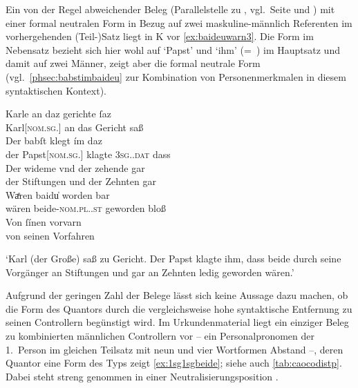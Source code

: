 \label{phsec:baideuwarn3}
Ein von der Regel abweichender Beleg (Parallelstelle zu \cite[\pno~75rb,3--4]{kc:C1}, vgl.~Seite \pageref{phsec:babstimbaideu} und
\pageref{phsec:baideuwarn}) mit einer formal neutralen Form in Bezug auf zwei
maskuline-männlich Referenten im vorhergehenden (Teil-)Satz liegt in
K vor \cref{ex:baideuwarn3}. Die Form  im Nebensatz
bezieht sich hier wohl auf
 `Papst' und  `ihm' (=~) im
Hauptsatz und damit auf zwei Männer, zeigt aber die formal neutrale Form
(vgl.~\cref{phsec:babstimbaideu} zur Kombination von Personenmerkmalen in
diesem syntaktischen Kontext).

\begin{exe}
\ex \label{ex:baideuwarn3}
	\gll Karle an daz gerichte ſaz \\
	    Karl[\textsc{nom.sg.\MascM}] an das Gericht saß \\
\sn \gll Der babſt klegt ím daz \\
		der Papst[\textsc{nom.sg.\MascM}] klagte \textsc{3sg.\MascM.dat} dass \\
\sn \gll Der wideme vnd der zehende gar \\
		der Stiftungen und der Zehnten gar \\
\sn \gll Waͤren baidu̍ worden bar \\
		wären beide-\textsc{nom.pl.\NeutM.st} geworden bloß \\
\sn \gll Von ſínen vorvarn \\
		von seinen Vorfahren \\
	\begin{taggedline}{\parencites[\pno~85vb,21--25]{kc:K}[vgl. abweichend][14382--14386]{schroeder1895}}
	\trans `Karl (der Große) saß zu Gericht. Der Papst klagte ihm, dass
		beide durch seine Vorgänger an Stiftungen und gar an Zehnten ledig
		geworden wären.'
	\end{taggedline}
\end{exe}

Aufgrund der geringen Zahl der Belege lässt sich keine Aussage dazu machen, ob
die Form des Quantors durch die vergleichsweise hohe syntaktische Entfernung zu
seinen Controllern begünstigt wird. Im Urkundenmaterial liegt ein einziger
Beleg zu kombinierten männlichen Controllern vor -- ein Personalpronomen der
1.~Person im gleichen Teilsatz mit neun und vier Wortformen Abstand --, deren
Quantor eine Form des Typs  zeigt \cref{ex:1sg1sgbeide}; siehe auch
\cref{tab:caocodistp}. Dabei steht  streng genommen in einer
Neutralisierungsposition
\autocites[vgl.][90--91]{askedal1973}[191]{gjelsten1980}.

